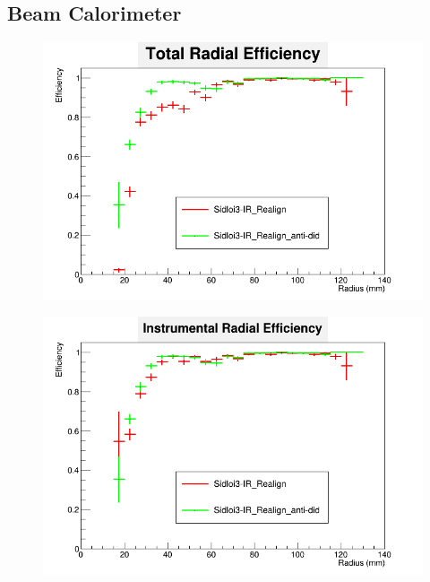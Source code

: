 \documentclass{report}
\begin{document}
            \subsection{Beam Calorimeter}
                \begin{figure}[H] 
                    \includegraphics[width=\textwidth]{RadialEfficiency_total_did}
                    \centering
                    \caption{}
                    \label{did_beamcal_total}
                \end{figure}
                \begin{figure}[H]
                    \includegraphics[width=\textwidth]{RadialEfficiency_instrumental_did}
                    \centering
                    \caption{}
                    \label{did_beamcal_inst}
                \end{figure}
\end{document}
